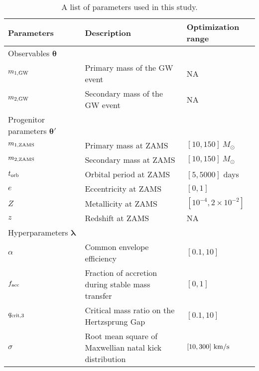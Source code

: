 \documentclass[linenumbers,twocolumn]{aastex631}
\begin{document}
\begin{table*}[hbt!]
    \begin{center}
    \begin{tabular}{ l l l }
    \hline
    \hline
    Parameters &  Description & Optimization range\\
    \hline
    \hline
    Observables $\bm{\theta}$ &\ &\  \\
    \hline
    \hline
    $m_{\rm 1, GW}$ & Primary mass of the GW event & NA \\
    $m_{\rm 2, GW}$ & Secondary mass of the GW event  & NA\\
    \hline
    \hline
    Progenitor parameters $\bm{\theta'}$&\ &\  \\
    \hline
    \hline
    $m_{\rm 1, ZAMS}$ & Primary mass at ZAMS & $[10,150]\ M_{\odot}$\\
    $m_{\rm 2, ZAMS}$ & Secondary mass at ZAMS & $[10,150]\ M_{\odot}$\\
    $t_{\rm orb}$ & Orbital period at ZAMS & $[5,5000]$ days\\
    $e$ & Eccentricity at ZAMS & $[0,1]$\\
    $Z$ & Metallicity at ZAMS & $[10^{-4},2\times10^{-2}]$\\
    $z$ & Redshift at ZAMS & NA\\
    \hline
    \hline
    Hyperparameters $\bm{\lambda    }$ &\ &\ \\
    \hline
    \hline

    $\alpha$ & Common envelope efficiency & $[0.1,10]$\\
    $f_{\rm acc}$ & Fraction of accretion during stable mass transfer &
    $[0,1]$\\
    $q_{\rm crit,3}$ & Critical mass ratio on the Hertzsprung Gap & $[0.1,10]$\\
    $\sigma$ & Root mean square of Maxwellian natal kick distribution&
    $[10,300]\ {\rm km/s}$\\


    \hline
    \hline
    \end{tabular}
    \caption{A list of parameters used in this study.}
    \label{tab:parameters}
    \end{center}
\end{table*}
\end{document}

